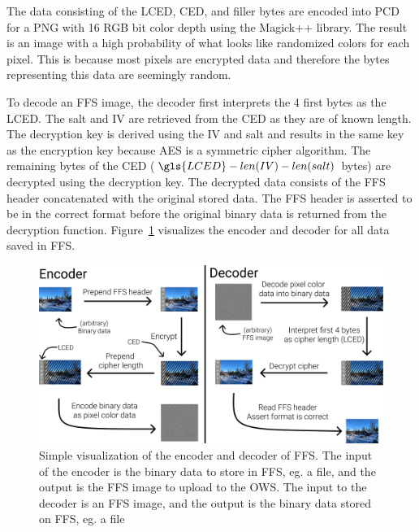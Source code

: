 The data consisting of the \gls{LCED}, CED, and filler bytes are encoded into \gls{PCD} for a PNG with 16 \gls{RGB} bit color depth using the Magick++ library. The result is an image with a high probability of what looks like randomized colors for each pixel. This is because most pixels are encrypted data and therefore the bytes representing this data are seemingly random.

To decode an \gls{FFS} image, the decoder first interprets the 4 first bytes as the \gls{LCED}. The salt and \gls{IV} are retrieved from the \gls{CED} as they are of known length. The decryption key is derived using the \gls{IV} and salt and results in the same key as the encryption key because \gls{AES} is a symmetric cipher algorithm. The remaining bytes of the \gls{CED} ($\gls{LCED} - len(IV) - len(salt)$ bytes) are decrypted using the decryption key. The decrypted data consists of the \gls{FFS} header concatenated with the original stored data. The \gls{FFS} header is asserted to be in the correct format before the original binary data is returned from the decryption function. Figure~\ref{fig:file_enc_dec} visualizes the encoder and decoder for all data saved in \gls{FFS}.

\begin{figure}[!ht]
	\begin{center}
	  \includegraphics[width=1.0\textwidth]{figures/encoder_decoder.png}
	\end{center}
	\caption[Simple visualization of the encoder and decoder of \gls{FFS}]{Simple visualization of the encoder and decoder of \gls{FFS}. The input of the encoder is the binary data to store in \gls{FFS}, eg. a file, and the output is the \gls{FFS} image to upload to the \gls{OWS}. The input to the decoder is an \gls{FFS} image, and the output is the binary data stored on \gls{FFS}, eg. a file}
	\label{fig:file_enc_dec}
\end{figure}


